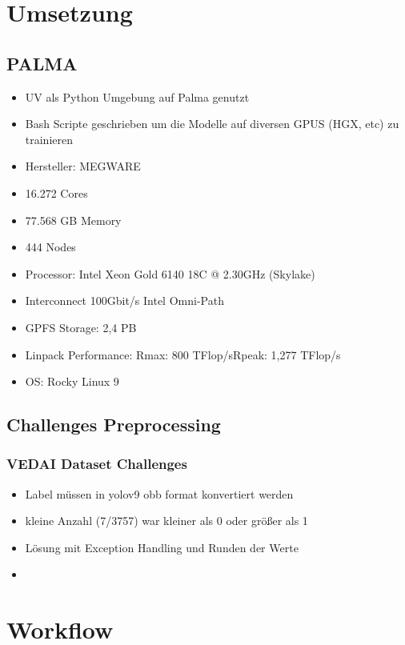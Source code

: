 \section{Umsetzung}
\subsection{PALMA}
\begin{itemize}
    \item UV als Python Umgebung auf Palma genutzt
    \item Bash Scripte geschrieben um die Modelle auf diversen GPUS (HGX, etc) zu trainieren
\end{itemize}
\begin{itemize}
    \item Hersteller: MEGWARE\cite{palma_spec}
    \item 16.272 Cores
    \item 77.568 GB Memory
    \item 444 Nodes
    \item Processor: Intel Xeon Gold 6140 18C @ 2.30GHz (Skylake)
    \item Interconnect 100Gbit/s Intel Omni-Path
    \item GPFS Storage: 2,4 PB
    \item Linpack Performance: Rmax: 800 TFlop/sRpeak: 1,277 TFlop/s
    \item OS: Rocky Linux 9 
\end{itemize}

\subsection{Challenges Preprocessing}
\subsubsection{VEDAI Dataset Challenges}
\begin{itemize}
    \item Label müssen in yolov9 obb format konvertiert werden
    \item kleine Anzahl (7/3757) war kleiner als 0 oder größer als 1
    \item Lösung mit Exception Handling und Runden der Werte
    \item {}
\end{itemize}

\section{Workflow}

